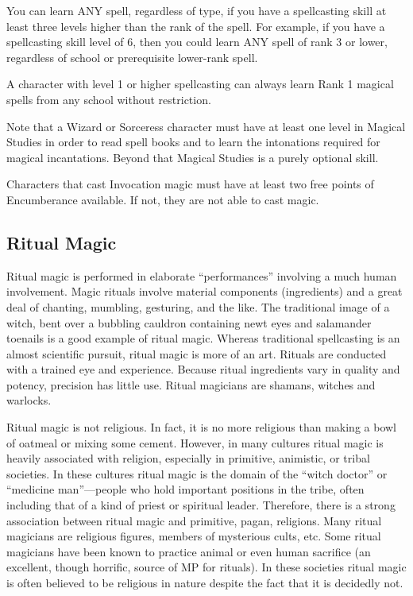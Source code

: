 You can learn ANY spell, regardless of type, if you have a
spellcasting skill at least three levels higher than the rank of the
spell.  For example, if you have a spellcasting skill level of 6, then
you could learn ANY spell of rank 3 or lower, regardless of school or
prerequisite lower-rank spell.

A character with level 1 or higher spellcasting can always learn Rank
1 magical spells from any school without restriction.

Note that a Wizard or Sorceress character must have at least one level
in Magical Studies in order to read spell books and to learn the
intonations required for magical incantations.  Beyond that Magical
Studies is a purely optional skill.

Characters that cast Invocation magic must have at least two free
points of Encumberance available.  If not, they are not able to cast
magic.


\subsection{Ritual Magic}

Ritual magic is performed in elaborate ``performances'' involving a
much human involvement.  Magic rituals involve material components
(ingredients) and a great deal of chanting, mumbling, gesturing, and
the like.  The traditional image of a witch, bent over a bubbling
cauldron containing newt eyes and salamander toenails is a good
example of ritual magic.  Whereas traditional spellcasting is an
almost scientific pursuit, ritual magic is more of an art. Rituals are
conducted with a trained eye and experience.  Because ritual
ingredients vary in quality and potency, precision has little
use. Ritual magicians are shamans, witches and warlocks.

Ritual magic is not religious.  In fact, it is no more religious than
making a bowl of oatmeal or mixing some cement.  However, in many
cultures ritual magic is heavily associated with religion, especially
in primitive, animistic, or tribal societies.  In these cultures
ritual magic is the domain of the ``witch doctor'' or ``medicine
man''---people who hold important positions in the tribe, often
including that of a kind of priest or spiritual leader.  Therefore,
there is a strong association between ritual magic and primitive,
pagan, religions.  Many ritual magicians are religious figures,
members of mysterious cults, etc.  Some ritual magicians have been
known to practice animal or even human sacrifice (an excellent, though
horrific, source of MP for rituals).  In these societies ritual magic
is often believed to be religious in nature despite the fact that it
is decidedly not.

